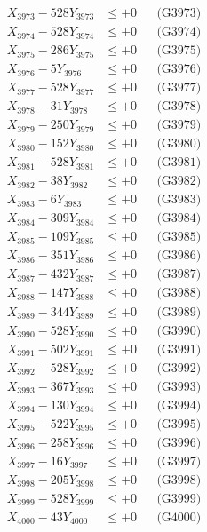 \documentclass[a4paper,10pt]{article}
\begin{document}
{\begin{align}
X_{3973} - 528Y_{3973} &\leq +0 && \text{(G3973)} \\
X_{3974} - 528Y_{3974} &\leq +0 && \text{(G3974)} \\
X_{3975} - 286Y_{3975} &\leq +0 && \text{(G3975)} \\
X_{3976} - 5Y_{3976} &\leq +0 && \text{(G3976)} \\
X_{3977} - 528Y_{3977} &\leq +0 && \text{(G3977)} \\
X_{3978} - 31Y_{3978} &\leq +0 && \text{(G3978)} \\
X_{3979} - 250Y_{3979} &\leq +0 && \text{(G3979)} \\
X_{3980} - 152Y_{3980} &\leq +0 && \text{(G3980)} \\
\allowbreak
X_{3981} - 528Y_{3981} &\leq +0 && \text{(G3981)} \\
X_{3982} - 38Y_{3982} &\leq +0 && \text{(G3982)} \\
X_{3983} - 6Y_{3983} &\leq +0 && \text{(G3983)} \\
X_{3984} - 309Y_{3984} &\leq +0 && \text{(G3984)} \\
X_{3985} - 109Y_{3985} &\leq +0 && \text{(G3985)} \\
X_{3986} - 351Y_{3986} &\leq +0 && \text{(G3986)} \\
X_{3987} - 432Y_{3987} &\leq +0 && \text{(G3987)} \\
X_{3988} - 147Y_{3988} &\leq +0 && \text{(G3988)} \\
X_{3989} - 344Y_{3989} &\leq +0 && \text{(G3989)} \\
X_{3990} - 528Y_{3990} &\leq +0 && \text{(G3990)} \\
\allowbreak
X_{3991} - 502Y_{3991} &\leq +0 && \text{(G3991)} \\
X_{3992} - 528Y_{3992} &\leq +0 && \text{(G3992)} \\
X_{3993} - 367Y_{3993} &\leq +0 && \text{(G3993)} \\
X_{3994} - 130Y_{3994} &\leq +0 && \text{(G3994)} \\
X_{3995} - 522Y_{3995} &\leq +0 && \text{(G3995)} \\
X_{3996} - 258Y_{3996} &\leq +0 && \text{(G3996)} \\
X_{3997} - 16Y_{3997} &\leq +0 && \text{(G3997)} \\
X_{3998} - 205Y_{3998} &\leq +0 && \text{(G3998)} \\
X_{3999} - 528Y_{3999} &\leq +0 && \text{(G3999)} \\
X_{4000} - 43Y_{4000} &\leq +0 && \text{(G4000)} \\

\end{align}}
\end{document}

